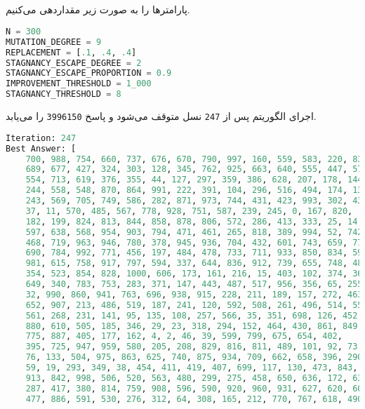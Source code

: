 \documentclass[a4paper, 12pt]{article}
\theoremstyle{definition}
\begin{document}
\subsection{}


پارامترها را به صورت زیر مقداردهی می‌کنیم.

\LTR
\begin{lstlisting}[language=Python]
N = 300
MUTATION_DEGREE = 9
REPLACEMENT = [.1, .4, .4]
STAGNANCY_ESCAPE_DEGREE = 2
STAGNANCY_ESCAPE_PROPORTION = 0.9
IMPROVEMENT_THRESHOLD = 1_000
STAGNANCY_THRESHOLD = 8
\end{lstlisting}
\RTL


اجرای الگوریتم پس از
\texttt{247}
نسل متوقف می‌شود و پاسخ
\texttt{3996150}
را می‌یابد.

\LTR
\begin{lstlisting}[language=Python]
Iteration: 247
Best Answer: [
    700, 988, 754, 660, 737, 676, 670, 790, 997, 160, 559, 583, 220, 832,
    689, 677, 427, 324, 303, 128, 345, 762, 925, 663, 640, 555, 447, 576,
    554, 713, 619, 376, 355, 44, 127, 297, 359, 386, 628, 207, 178, 144,
    244, 558, 548, 870, 864, 991, 222, 391, 104, 296, 516, 494, 174, 138,
    243, 569, 705, 749, 586, 282, 871, 973, 744, 431, 423, 993, 302, 43,
    37, 11, 570, 485, 567, 778, 928, 751, 587, 239, 245, 0, 167, 820,
    182, 199, 824, 813, 844, 858, 878, 806, 572, 286, 413, 333, 25, 14,
    597, 638, 568, 954, 903, 794, 471, 461, 265, 818, 389, 994, 52, 742,
    468, 719, 963, 946, 780, 378, 945, 936, 704, 432, 601, 743, 659, 776,
    690, 784, 992, 771, 456, 197, 484, 478, 733, 711, 933, 850, 834, 593,
    981, 615, 758, 917, 797, 594, 337, 644, 836, 912, 739, 655, 748, 48,
    354, 523, 854, 828, 1000, 606, 173, 161, 216, 15, 403, 102, 374, 368,
    649, 340, 783, 753, 283, 371, 147, 443, 487, 517, 956, 356, 65, 255,
    32, 990, 860, 941, 763, 696, 938, 915, 228, 211, 189, 157, 272, 463,
    652, 907, 213, 486, 519, 187, 241, 120, 592, 508, 261, 496, 514, 550,
    561, 268, 231, 141, 95, 135, 108, 257, 566, 35, 351, 698, 126, 452,
    880, 610, 505, 185, 346, 29, 23, 318, 294, 152, 464, 430, 861, 849,
    775, 887, 405, 177, 162, 4, 2, 46, 39, 599, 799, 675, 654, 402,
    395, 725, 947, 959, 580, 205, 208, 829, 816, 811, 489, 101, 92, 73,
    76, 133, 504, 975, 863, 625, 740, 875, 934, 709, 662, 658, 396, 290,
    59, 19, 293, 349, 38, 454, 411, 419, 407, 699, 117, 130, 473, 843,
    913, 842, 998, 506, 520, 563, 480, 299, 275, 458, 650, 636, 172, 63,
    287, 417, 380, 814, 759, 908, 596, 590, 920, 960, 931, 627, 620, 603,
    477, 886, 591, 530, 276, 312, 64, 308, 165, 212, 770, 767, 618, 490,

\end{lstlisting}
\end{document}
